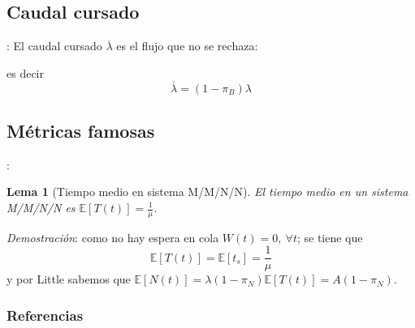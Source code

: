 \documentclass[xcolor={x11names}]{beamer}
\newtheorem{lema}{Lema}[section]
\begin{document}
\subsection{Caudal cursado}
\begin{frame}{\secname: \subsecname}
    El caudal cursado $\overline{\lambda}$
    es el flujo que no se rechaza:
    \begin{figure}
        \resizebox{!}{.3\textwidth}{%
            
        }
    \end{figure}
    es decir
    \begin{equation*}
        \overline{\lambda}=
        (1-\pi_B)\lambda
    \end{equation*}
\end{frame}



\subsection{Métricas famosas}
\begin{frame}{\secname: \subsecname}
    \begin{lema}[Tiempo medio en sistema
        M/M/N/N]
        El tiempo medio en un sistema
        M/M/N/N es
        $\mathbb{E}[T(t)]=\frac{1}{\mu}$.
    \end{lema}
    
    \begin{figure}
        \resizebox{!}{.2\textwidth}{%
            
        }
    \end{figure}

    \textit{Demostración}: como no
    hay espera en cola $W(t)=0,\ \forall t$;
    se tiene que
    \begin{equation*}
        \mathbb{E}[T(t)]=\mathbb{E}[t_s]
        =\frac{1}{\mu}
    \end{equation*}
    y por Little sabemos
    que $\mathbb{E}[N(t)]=\lambda(1-\pi_N)\mathbb{E}[T(t)]=A(1-\pi_N)$.
\end{frame}

\begin{frame}
    \begin{figure}
        
    \end{figure}
\end{frame}


\begin{frame}[allowframebreaks]
        \nocite{amable}
        \frametitle{Referencias}
        
        
\end{frame}
\end{document}

